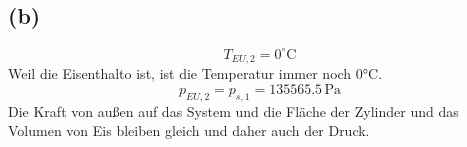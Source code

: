 

\subsection*{(b)}

\[
T_{EU,2} = 0^\circ \text{C}
\]
Weil die Eisenthalto ist, ist die Temperatur immer noch 0°C.
\[
p_{EU,2} = p_{s,1} = 135565.5 \, \text{Pa}
\]
Die Kraft von außen auf das System und die Fläche der Zylinder und das Volumen von Eis bleiben gleich und daher auch der Druck.